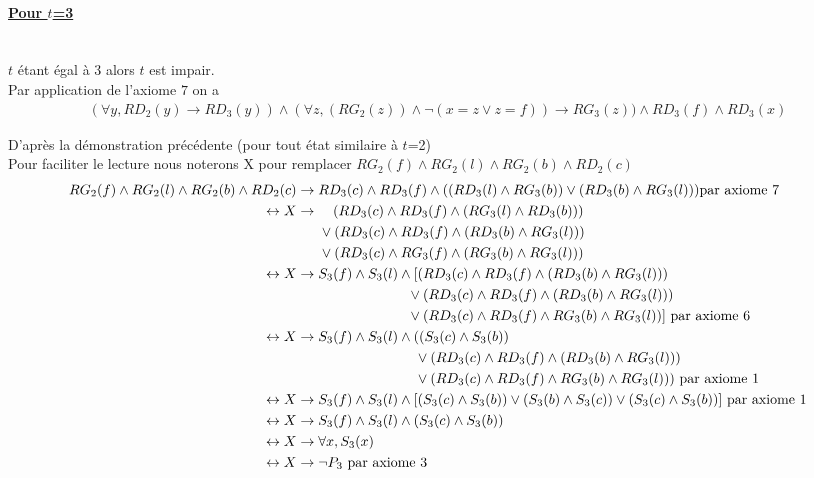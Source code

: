 \documentclass{article}
\begin{document}
\paragraph{\underline{Pour $t$=3}}~~\\
$t$ étant égal à 3 alors $t$ est impair.\\
Par application de l'axiome $ 7$ on a
\begin{align*}
  (\forall y, RD_{2}(y) \to RD_{3}(y)) \wedge (\forall z,(RG_{2}(z)) \wedge \neg(x=z \vee z=f)) \rightarrow RG_3(z)) \wedge RD_3(f) \wedge RD_3(x)
\end{align*}

D'après la démonstration précédente (pour tout état similaire à $t$=2)\\
Pour faciliter le lecture nous noterons X  pour remplacer $RG_2(f) \wedge RG_2(l) \wedge RG_2(b) \wedge RD_2(c)$
\begin{align*}
    RG_2(f) \wedge RG_2(l) \wedge RG_2(b) \wedge RD_2(c)& \to RD_3(c) \wedge RD_3(f) \wedge ((RD_3(l)\wedge RG_3(b))\vee (RD_3(b)\wedge RG_3(l))) \text{par axiome 7}\\
    \leftrightarrow  X& \to \hphantom{aa} (RD_3(c)\wedge RD_3(f)\wedge (RG_3(l)\wedge RD_3(b)))\\
    & \hphantom{aaa}\vee (RD_3(c)\wedge RD_3(f)\wedge (RD_3(b)\wedge RG_3(l)))\\
    & \hphantom{aaa}\vee (RD_3(c) \wedge RG_3(f) \wedge (RG_3(b) \wedge RG_3(l)))\\
    \leftrightarrow  X& \to  S_3(f) \wedge S_3(l) \wedge [(RD_3(c)\wedge RD_3(f)\wedge (RD_3(b)\wedge RG_3(l)))  \\
    & \hphantom{aaaaaaaaaaaaaaa} \vee (RD_3(c)\wedge RD_3(f)\wedge (RD_3(b)\wedge RG_3(l)))\\
    & \hphantom{aaaaaaaaaaaaaaa}\vee (RD_3(c) \wedge RD_3(f) \wedge RG_3(b) \wedge RG_3(l))]\text{ par axiome } 6\\
     \leftrightarrow  X& \to S_3(f) \wedge S_3(l) \wedge ((S_3(c)\wedge S_3(b))\\
    &\hphantom{aaaaaaaaaaaaaaaa}\vee (RD_3(c)\wedge RD_3(f)\wedge (RD_3(b)\wedge RG_3(l)))\\
    &\hphantom{aaaaaaaaaaaaaaaa}\vee (RD_3(c) \wedge RD_3(f) \wedge RG_3(b) \wedge RG_3(l)))\text{ par axiome }  1\\
    \leftrightarrow  X& \to S_3(f) \wedge S_3(l) \wedge [(S_3(c)\wedge S_3(b)) \vee (S_3(b)\wedge S_3(c)) \vee (S_3(c)\wedge S_3(b))]\text{ par axiome }  1\\
    \leftrightarrow  X& \to S_3(f) \wedge S_3(l) \wedge (S_3(c)\wedge S_3(b))\\
    \leftrightarrow  X& \to \forall x, S_3(x)\\
    \leftrightarrow  X& \to \neg P_3 \text{ par axiome }  3
\end{align*}
\end{document}
